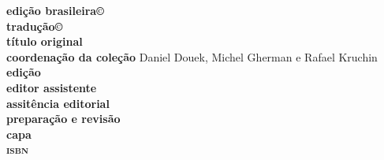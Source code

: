 \newcommand{\linha}[2]{\ifdef{#2}{\linhalayout{#1}{#2}}{}}

\begingroup\tiny
\parindent=0cm
\thispagestyle{empty}

\textbf{edição brasileira©}\\
\textbf{tradução©}\\

\textbf{título original}\\

\textbf{coordenação da coleção}		 		 {Daniel Douek, Michel Gherman 
											 e Rafael Kruchin}\\
\textbf{edição}\\
\textbf{editor assistente}\\
\textbf{assitência editorial}\\
\textbf{preparação e revisão}\\
\textbf{capa}\\

\textbf{\textsc{isbn}}
 
\vfill

